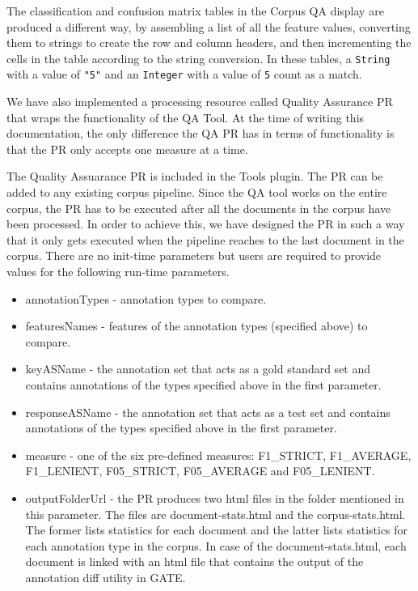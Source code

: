 The classification and confusion matrix tables in the Corpus QA display are
produced a different way, by assembling a list of all the feature values,
converting them to strings to create the row and column headers, and then
incrementing the cells in the table according to the string conversion.  In
these tables, a \texttt{String} with a value of \texttt{"5"} and an
\texttt{Integer} with a value of \texttt{5} count as a match.

We have also implemented a processing resource called Quality Assurance PR that
wraps the functionality of the QA Tool.  At the time of writing this 
documentation, the only difference the QA PR has in terms of functionality is 
that the PR only accepts one measure at a time.

The Quality Assuarance PR is included in the Tools plugin.  The PR can be added 
to any existing corpus pipeline.  Since the QA tool works on the entire corpus, 
the PR has to be executed after all the documents in the corpus have been 
processed.  In order to achieve this, we have designed the PR in such a way that
it only gets executed when the pipeline reaches to the last document in the 
corpus.  There are no init-time parameters but users are required to provide 
values for the following run-time parameters.

\begin{itemize}
\item annotationTypes - annotation types to compare.
\item featuresNames - features of the annotation types (specified above) to 
compare.
\item keyASName - the annotation set that acts as a gold standard set and 
contains annotations of the types specified above in the first parameter.
\item responseASName - the annotation set that acts as a test set and contains 
annotations of the types specified above in the first parameter.
\item measure - one of the six pre-defined measures: F1\_STRICT, F1\_AVERAGE,
F1\_LENIENT, F05\_STRICT, F05\_AVERAGE and F05\_LENIENT.
\item outputFolderUrl - the PR produces two html files in the folder mentioned 
in this parameter.  The files are document-stats.html and the corpus-stats.html.
The former lists statistics for each document and the latter lists statistics 
for each annotation type in the corpus. In case of the document-stats.html, each
document is linked with an html file that contains the output of the
annotation diff utility in GATE.
\end{itemize}
%

